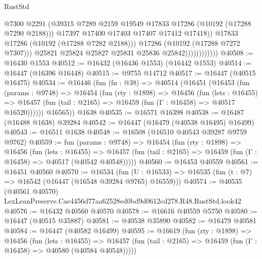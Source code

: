 \begin{lexlean}{RustStd}
\begin{coremodule}
                                    @7300
                                    @2291
                                    (@39315
                                      @7289
                                      @2159
                                      @19549
                                      @17833
                                      @17286
                                      (@10192 (@17288 @7290 @2188)))
                                    @17397
                                    @17400
                                    @17403
                                    @17407
                                    @17412
                                    @17418))
                                @17833
                                @17286
                                (@10192 (@17288 @7282 @2188)))
                              @17286
                              (@10192 (@17288 @7272 @7307)))
                            @25821
                            @25824
                            @25827
                            @25831
                            @25836
                            @25842))))))))))))
@40508 := @16430 @1553
@40512 := @16432 (@16436 @1553) (@16442 @1553)
@40514 := @16447 (@16396 @16448)
@40515 := @9755 @14712
@40517 := @16447 (@40515 @16475)
@40534 := @16446
    (fun (fn : @38) =>
    @40514
      (@16451
        (@16453
          (fun (params : @9748) =>
          @16454
            (fun (rty : @1898) =>
            @16456
              (fun (lets : @16455) =>
              @16457 (fun (tail : @2165) => @16459 (fun (Γ : @16458) => @40517 @16520))))))
        @16565))
    @1638
@40535 := @16571 @16398
@40538 := @16487 (@16488 @1638) @39284
@40542 := @16447 (@16479 (@40538 @16495) @16499)
@40543 := @16511 @1638
@40548 := @16508 (@16510 @40543 @39287 @9759 @9762)
@40559 := fun (params : @9748) =>
  @16454
    (fun (rty : @1898) =>
    @16456
      (fun (lets : @16455) =>
      @16457 (fun (tail : @2165) => @16459 (fun (Γ : @16458) => @40517 (@40542 @40548)))))
@40560 := @16453 @40559
@40561 := @16451 @40560
@40570 := @16534
    (fun (U : @16533) => @16535 (fun (t : @7) => @16542 (@16447 (@16548 @39284 @9765) @16559)))
@40574 := @40535
    (@40561 @40570)
    LexLeanPreserve.Cae4456d77aa62528ed0bd9d0612cd278.R48.RustStd.look42
@40576 := @16432 @40560 @40570
@40578 := @16616 @40559 @5750
@40580 := @16447 (@40515 @35887)
@40581 := @40538 @35890
@40582 := @16479 @40581
@40584 := @16447 (@40582 @16499)
@40595 := @16619
    (fun (rty : @1898) =>
    @16456
      (fun (lets : @16455) =>
      @16457 (fun (tail : @2165) => @16459 (fun (Γ : @16458) => @40580 (@40584 @40548)))))

\end{coremodule}
\end{lexlean}
